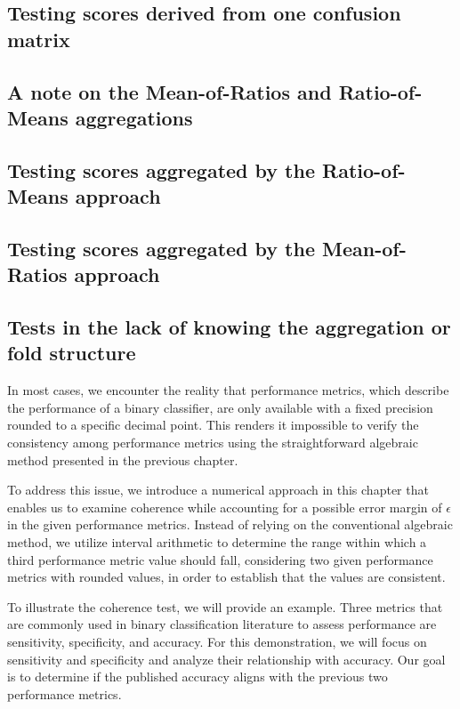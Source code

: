 \documentclass[5p, final]{elsarticle}
\begin{document}
\subsection{Testing scores derived from one confusion matrix}

\subsection{A note on the Mean-of-Ratios and Ratio-of-Means aggregations}

\subsection{Testing scores aggregated by the Ratio-of-Means approach}

\subsection{Testing scores aggregated by the Mean-of-Ratios approach}

\subsection{Tests in the lack of knowing the aggregation or fold structure}

In most cases, we encounter the reality that performance metrics, which describe the performance of a binary classifier, are only available with a fixed precision rounded to a specific decimal point. This renders it impossible to verify the consistency among performance metrics using the straightforward algebraic method presented in the previous chapter.

To address this issue, we introduce a numerical approach in this chapter that enables us to examine coherence while accounting for a possible error margin of $\epsilon$ in the given performance metrics. Instead of relying on the conventional algebraic method, we utilize interval arithmetic to determine the range within which a third performance metric value should fall, considering two given performance metrics with rounded values, in order to establish that the values are consistent.

To illustrate the coherence test, we will provide an example. Three metrics that are commonly used in binary classification literature to assess performance are sensitivity, specificity, and accuracy. For this demonstration, we will focus on sensitivity and specificity and analyze their relationship with accuracy. Our goal is to determine if the published accuracy aligns with the previous two performance metrics.
\end{document}
